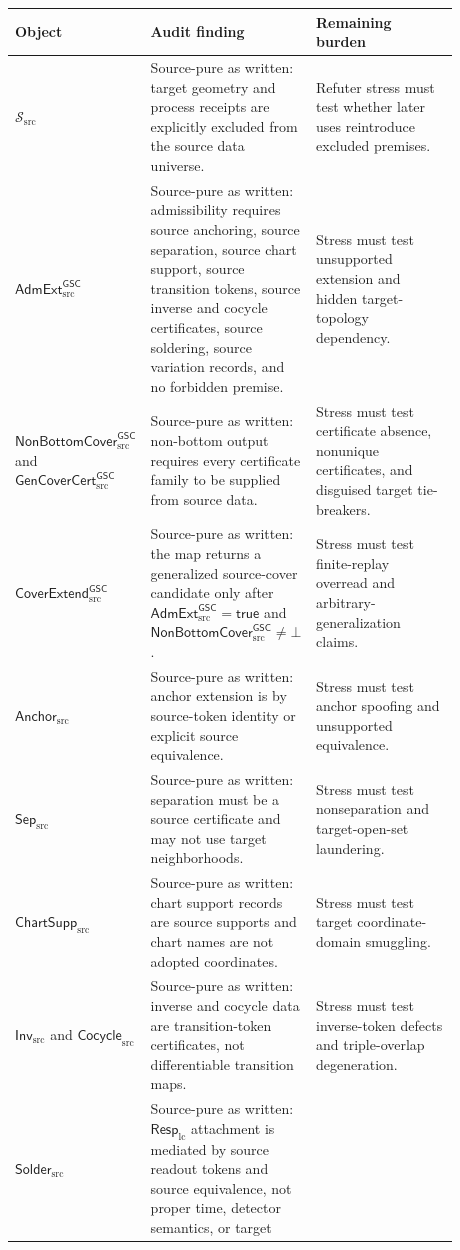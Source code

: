 \documentclass[11pt]{article}
\newcommand{\RespLC}{\mathsf{Resp}_{\mathrm{lc}}}
\newcommand{\AdmExt}{\mathsf{AdmExt}_{\mathrm{src}}^{\mathsf{GSC}}}
\newcommand{\CoverExt}{\mathsf{CoverExtend}_{\mathrm{src}}^{\mathsf{GSC}}}
\newcommand{\NonBottom}{\mathsf{NonBottomCover}_{\mathrm{src}}^{\mathsf{GSC}}}
\newcommand{\Cert}{\mathsf{GenCoverCert}_{\mathrm{src}}^{\mathsf{GSC}}}
\newcommand{\Anchor}{\mathsf{Anchor}_{\mathrm{src}}}
\newcommand{\SepSrc}{\mathsf{Sep}_{\mathrm{src}}}
\newcommand{\ChartSuppSrc}{\mathsf{ChartSupp}_{\mathrm{src}}}
\newcommand{\SolderSrc}{\mathsf{Solder}_{\mathrm{src}}}
\newcommand{\Bot}{\bot}
\begin{document}
\begin{center}
\begin{tabular}{p{0.20\linewidth}p{0.36\linewidth}p{0.32\linewidth}}
\hline
Object & Audit finding & Remaining burden \\
\hline
\(\mathcal{S}_{\mathrm{src}}\) &
Source-pure as written: target geometry and process receipts are explicitly
excluded from the source data universe. &
Refuter stress must test whether later uses reintroduce excluded premises. \\
\(\AdmExt\) &
Source-pure as written: admissibility requires source anchoring, source
separation, source chart support, source transition tokens, source inverse
and cocycle certificates, source soldering, source variation records, and no
forbidden premise. &
Stress must test unsupported extension and hidden target-topology dependency. \\
\(\NonBottom\) and \(\Cert\) &
Source-pure as written: non-bottom output requires every certificate family
to be supplied from source data. &
Stress must test certificate absence, nonunique certificates, and disguised
target tie-breakers. \\
\(\CoverExt\) &
Source-pure as written: the map returns a generalized source-cover candidate
only after \(\AdmExt=\mathsf{true}\) and \(\NonBottom\neq\Bot\). &
Stress must test finite-replay overread and arbitrary-generalization claims. \\
\(\Anchor\) &
Source-pure as written: anchor extension is by source-token identity or
explicit source equivalence. &
Stress must test anchor spoofing and unsupported equivalence. \\
\(\SepSrc\) &
Source-pure as written: separation must be a source certificate and may not
use target neighborhoods. &
Stress must test nonseparation and target-open-set laundering. \\
\(\ChartSuppSrc\) &
Source-pure as written: chart support records are source supports and chart
names are not adopted coordinates. &
Stress must test target coordinate-domain smuggling. \\
\(\mathsf{Inv}_{\mathrm{src}}\) and \(\mathsf{Cocycle}_{\mathrm{src}}\) &
Source-pure as written: inverse and cocycle data are transition-token
certificates, not differentiable transition maps. &
Stress must test inverse-token defects and triple-overlap degeneration. \\
\(\SolderSrc\) &
Source-pure as written: \(\RespLC\) attachment is mediated by source readout
tokens and source equivalence, not proper time, detector semantics, or target

\end{tabular}
\end{center}
\end{document}
